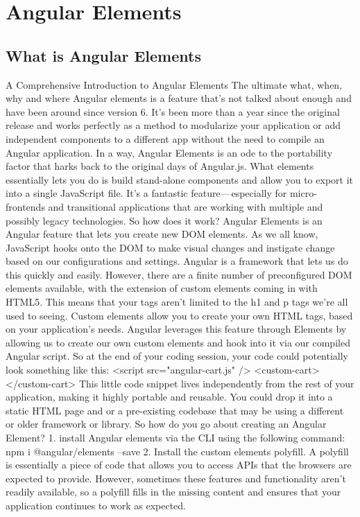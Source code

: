 \chapter{ Angular Elements }

\section{What is Angular Elements}
A Comprehensive Introduction to Angular Elements
The ultimate what, when, why and where 
Angular elements is a feature that’s not talked about enough and have been around since version 6. It’s been more than a year since the original release and works perfectly as a method to modularize your application or add independent components to a different app without the need to compile an Angular application.
In a way, Angular Elements is an ode to the portability factor that harks back to the original days of Angular.js. What elements essentially lets you do is build stand-alone components and allow you to export it into a single JavaScript file. 
It’s a fantastic feature — especially for micro-frontends and transitional applications that are working with multiple and possibly legacy technologies. 
So how does it work?
Angular Elements is an Angular feature that lets you create new DOM elements. As we all know, JavaScript hooks onto the DOM to make visual changes and instigate change based on our configurations and settings. Angular is a framework that lets us do this quickly and easily.
However, there are a finite number of preconfigured DOM elements available, with the extension of custom elements coming in with HTML5. This means that your tags aren’t limited to the h1 and p tags we’re all used to seeing. 
Custom elements allow you to create your own HTML tags, based on your application’s needs. 
Angular leverages this feature through Elements by allowing us to create our own custom elements and hook into it via our compiled Angular script. 
So at the end of your coding session, your code could potentially look something like this:
<script src="angular-cart.js" />
<custom-cart></custom-cart>
This little code snippet lives independently from the rest of your application, making it highly portable and reusable. You could drop it into a static HTML page and or a pre-existing codebase that may be using a different or older framework or library.
So how do you go about creating an Angular Element?
1. install Angular elements via the CLI using the following command:
npm i @angular/elements --save
2. Install the custom elements polyfill. A polyfill is essentially a piece of code that allows you to access APIs that the browsers are expected to provide. However, sometimes these features and functionality aren’t readily available, so a polyfill fills in the missing content and ensures that your application continues to work as expected.
